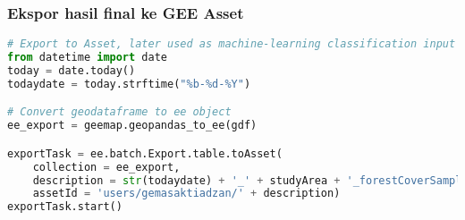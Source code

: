 \hypertarget{ekspor-hasil-final-ke-gee-asset}{%
\subsubsection{Ekspor hasil final ke GEE
Asset}\label{ekspor-hasil-final-ke-gee-asset}}

\begin{lstlisting}[language=Python]
# Export to Asset, later used as machine-learning classification input in GEE
from datetime import date
today = date.today()
todaydate = today.strftime("%b-%d-%Y")

# Convert geodataframe to ee object
ee_export = geemap.geopandas_to_ee(gdf)

exportTask = ee.batch.Export.table.toAsset(
    collection = ee_export,
    description = str(todaydate) + '_' + studyArea + '_forestCoverSamples',
    assetId = 'users/gemasaktiadzan/' + description)
exportTask.start()
\end{lstlisting}

\begin{lstlisting}[language=Python]
\end{lstlisting}
